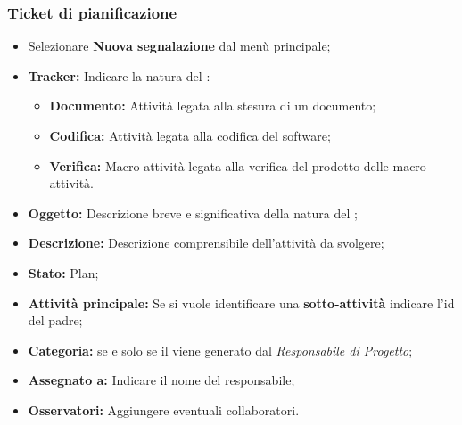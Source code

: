       \subsubsection{Ticket di pianificazione}
        \begin{itemize}
          \item Selezionare \textbf{Nuova segnalazione} dal menù principale;
          \item \textbf{Tracker: }Indicare la natura del :
          \bgroup
            \begin{itemize}
              \item \textbf{Documento: }Attività legata alla stesura di un documento;
              \item \textbf{Codifica: }Attività legata alla  codifica del software;
              \item \textbf{Verifica: }Macro-attività legata alla verifica del prodotto delle macro-attività.
            \end{itemize}
          \egroup
          \item \textbf{Oggetto: }Descrizione breve e significativa della natura del ;
          \item \textbf{Descrizione: }Descrizione comprensibile dell'attività da svolgere;
          \item \textbf{Stato: }Plan;
          \item \textbf{Attività principale: }Se si vuole identificare una \textbf{sotto-attività} indicare l'id del  padre;
          \item \textbf{Categoria: } se e solo se il  viene generato dal \emph{Responsabile di Progetto};
          \item \textbf{Assegnato a: }Indicare il nome del responsabile;
          \item \textbf{Osservatori: }Aggiungere eventuali collaboratori.
        \end{itemize}
